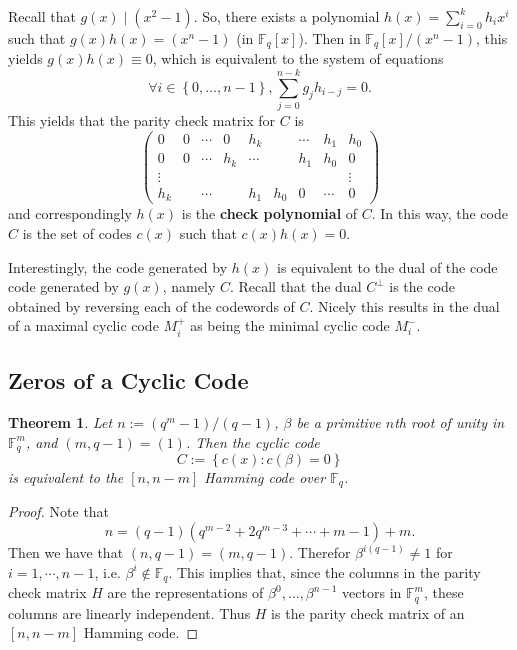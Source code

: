 \documentclass{article}
\newcommand{\F}{\mathbb{F}}
\newcommand{\dual}[1]{#1^\bot}
\renewcommand{\=}{\equiv}
\newcommand{\set}[1]{\left\{ #1 \right\}}
\theoremstyle{plain}
\newtheorem{thm}{Theorem}[subsection]
\theoremstyle{definition}
\begin{document}
Recall that $g(x) \mid (x^2 - 1)$.
So, there exists a polynomial $h(x) = \sum_{i=0}^k h_i x^i$ such that $g(x) h(x) = (x^n - 1)$ (in $\F_q[x]$).
Then in $\F_q[x]/(x^n-1)$, this yields $g(x) h(x) \= 0$,
which is equivalent to the system of equations
$$ \forall i \in \set{0, \dots, n-1}, \sum_{j=0}^{n-k} g_j h_{i-j} = 0. $$
This yields that the parity check matrix for $C$ is
$$ \begin{pmatrix}
0      & 0 & \cdots & 0   & h_k    &       & \cdots & h_1    & h_0 \\
0      & 0 & \cdots & h_k & \cdots &       & h_1    & h_0    & 0 \\
\vdots &   &        &     &        &       &        &        & \vdots \\
h_k    &   & \cdots &     & h_1    & h_0   & 0      & \cdots & 0
\end{pmatrix} $$
and correspondingly $h(x)$ is the \textbf{check polynomial} of $C$.
In this way, the code $C$ is the set of codes $c(x)$ such that $c(x)h(x) = 0$.

Interestingly, the code generated by $h(x)$ is equivalent to the dual of the code code generated by $g(x)$, namely $C$.
Recall that the dual $\dual C$ is the code obtained by reversing each of the codewords of $C$.
Nicely this results in the dual of a maximal cyclic code $M_i^+$ as being the minimal cyclic code $M_i^-$.

\subsection{Zeros of a Cyclic Code}

\begin{thm}
Let $n := (q^m - 1)/(q - 1)$, $\beta$ be a primitive $n$th root of unity in $\F_q^m$, and $(m, q-1) = (1)$.
Then the cyclic code
$$ C := \set{ c(x) : c(\beta) = 0 } $$
is equivalent to the $[n, n-m]$ Hamming code over $\F_q$.
\end{thm}
\begin{proof}
Note that
$$ n = (q-1) (q^{m-2} + 2q^{m-3} + \cdots + m - 1) + m. $$
Then we have that $(n, q-1) = (m, q-1)$.
Therefor $\beta^{i(q-1)} \neq 1$ for $i = 1, \cdots, n-1$, i.e. $\beta^i \not\in \F_q$.
This implies that, since the columns in the parity check matrix $H$ are the representations of $\beta^0, \dots, \beta^{n-1}$ vectors in $\F_q^m$, these columns are linearly independent.
Thus $H$ is the parity check matrix of an $[n, n-m]$ Hamming code.
\end{proof}
\end{document}
